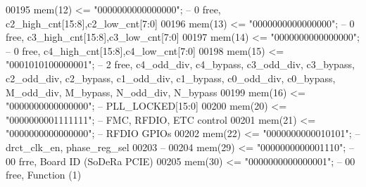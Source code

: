 \begin{DoxyCode}
00195             \textcolor{vhdlchar}{mem}\textcolor{vhdlchar}{(}\textcolor{vhdllogic}{}\textcolor{vhdllogic}{12}\textcolor{vhdlchar}{)} \textcolor{vhdlchar}{<=} \textcolor{vhdllogic}{"0000000000000000"};\textcolor{keyword}{ --  0 free, c2\_high\_cnt[15:8],c2\_low\_cnt[7:0]}
00196             \textcolor{vhdlchar}{mem}\textcolor{vhdlchar}{(}\textcolor{vhdllogic}{}\textcolor{vhdllogic}{13}\textcolor{vhdlchar}{)} \textcolor{vhdlchar}{<=} \textcolor{vhdllogic}{"0000000000000000"};\textcolor{keyword}{ --  0 free, c3\_high\_cnt[15:8],c3\_low\_cnt[7:0]}
00197             \textcolor{vhdlchar}{mem}\textcolor{vhdlchar}{(}\textcolor{vhdllogic}{}\textcolor{vhdllogic}{14}\textcolor{vhdlchar}{)} \textcolor{vhdlchar}{<=} \textcolor{vhdllogic}{"0000000000000000"};\textcolor{keyword}{ --  0 free, c4\_high\_cnt[15:8],c4\_low\_cnt[7:0]}
00198             \textcolor{vhdlchar}{mem}\textcolor{vhdlchar}{(}\textcolor{vhdllogic}{}\textcolor{vhdllogic}{15}\textcolor{vhdlchar}{)} \textcolor{vhdlchar}{<=} \textcolor{vhdllogic}{"0001010100000001"};\textcolor{keyword}{ -- 2 free, c4\_odd\_div, c4\_bypass, c3\_odd\_div, c3\_bypass,
       c2\_odd\_div, c2\_bypass, c1\_odd\_div, c1\_bypass, c0\_odd\_div, c0\_bypass, M\_odd\_div, M\_bypass, N\_odd\_div, N\_bypass}
00199             \textcolor{vhdlchar}{mem}\textcolor{vhdlchar}{(}\textcolor{vhdllogic}{}\textcolor{vhdllogic}{16}\textcolor{vhdlchar}{)}  \textcolor{vhdlchar}{<=} \textcolor{vhdllogic}{"0000000000000000"};\textcolor{keyword}{ -- PLL\_LOCKED[15:0]         }
00200             \textcolor{vhdlchar}{mem}\textcolor{vhdlchar}{(}\textcolor{vhdllogic}{}\textcolor{vhdllogic}{20}\textcolor{vhdlchar}{)} \textcolor{vhdlchar}{<=} \textcolor{vhdllogic}{"0000000001111111"};\textcolor{keyword}{ -- FMC, RFDIO, ETC control}
00201             \textcolor{vhdlchar}{mem}\textcolor{vhdlchar}{(}\textcolor{vhdllogic}{}\textcolor{vhdllogic}{21}\textcolor{vhdlchar}{)} \textcolor{vhdlchar}{<=} \textcolor{vhdllogic}{"0000000000000000"};\textcolor{keyword}{ -- RFDIO GPIOs}
00202             \textcolor{vhdlchar}{mem}\textcolor{vhdlchar}{(}\textcolor{vhdllogic}{}\textcolor{vhdllogic}{22}\textcolor{vhdlchar}{)} \textcolor{vhdlchar}{<=} \textcolor{vhdllogic}{"0000000000010101"};\textcolor{keyword}{ -- drct\_clk\_en, phase\_reg\_sel}
00203 \textcolor{keyword}{            --}
00204             \textcolor{vhdlchar}{mem}\textcolor{vhdlchar}{(}\textcolor{vhdllogic}{}\textcolor{vhdllogic}{29}\textcolor{vhdlchar}{)}  \textcolor{vhdlchar}{<=} \textcolor{vhdllogic}{"0000000000001110"};\textcolor{keyword}{ -- 00 frre, Board ID (SoDeRa PCIE)}
00205             \textcolor{vhdlchar}{mem}\textcolor{vhdlchar}{(}\textcolor{vhdllogic}{}\textcolor{vhdllogic}{30}\textcolor{vhdlchar}{)}  \textcolor{vhdlchar}{<=} \textcolor{vhdllogic}{"0000000000000001"};\textcolor{keyword}{ -- 00 free, Function (1)}

\end{DoxyCode}

